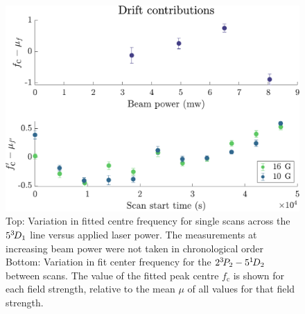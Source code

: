 \begin{figure}
  \begin{minipage}[t]{0.6\textwidth}
  \vspace{0pt}
  \includegraphics[width=\textwidth]{fig/spectroscopy/power-drift-combined-eps-converted-to.pdf}
  \end{minipage}\hfill
  \begin{minipage}[t]{0.38\textwidth}
  \vspace{0pt}
\caption{Top: Variation in fitted centre frequency for single scans across the $5^{3\!} D_1$ line versus applied laser power.
	The measurements at increasing beam power were not taken in chronological order Bottom: Variation in fit center frequency for the $2^{3\!} P_2 - 5^{1\!} D_2$ between scans.
	The value of the fitted peak centre $f_\textrm{c}$ is shown for each field strength, relative to the mean $\mu$ of all values for that field strength.}
\label{fig:power_drift_combined}
  \end{minipage}
\end{figure}


